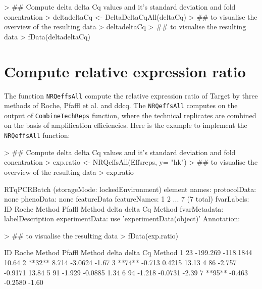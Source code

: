 \documentclass[11pt]{article}
\newcommand{\code}[1]{{\tt #1}}
\begin{document}
\begin{Schunk}
\begin{Sinput}
> ## Compute delta delta Cq values and it's standard deviation and fold conentration
> deltadeltaCq <- DeltaDeltaCqAll(deltaCq)
> ## to visualise the overview of the resulting data
> deltadeltaCq 
> ## to visualise the resulting data
> fData(deltadeltaCq) 
\end{Sinput}
\end{Schunk}

\section{Compute relative expression ratio} 
The function \code{NRQeffsAll} compute the relative expression ratio of Target by three methods of Roche, Pfaffl et al. and ddcq. The \code{NRQeffsAll} computes on the output of \code{CombineTechReps} function, where the technical replicates are combined on the basis of amplification efficiencies. Here is the example to implement the \code{NRQeffsAll} function:

\begin{Schunk}
\begin{Sinput}
> ## Compute delta delta Cq values and it's standard deviation and fold conentration
> exp.ratio <- NRQeffsAll(Effsreps, y= "hk")
> ## to visualise the overview of the resulting data
> exp.ratio 
\end{Sinput}
\begin{Soutput}
RTqPCRBatch (storageMode: lockedEnvironment)
  element names:  
protocolData: none
phenoData: none
featureData
  featureNames: 1 2 ... 7 (7 total)
  fvarLabels: ID Roche Method Pfaffl Method delta delta Cq Method
  fvarMetadata: labelDescription
experimentData: use 'experimentData(object)'
Annotation:  
\end{Soutput}
\begin{Sinput}
> ## to visualise the resulting data
> fData(exp.ratio) 
\end{Sinput}
\begin{Soutput}
      ID Roche Method Pfaffl Method delta delta Cq Method
1     23     -199.269     -118.1844                 10.64
2 **32**        8.714       -3.0624                 -1.67
3 **74**       -0.713        0.4215                 13.13
4     86       -2.757       -0.9171                 13.84
5     91       -1.929       -0.0885                  1.34
6     94       -1.218       -0.0731                 -2.39
7 **95**       -0.463       -0.2580                 -1.60
\end{Soutput}
\end{Schunk}
\end{document}

